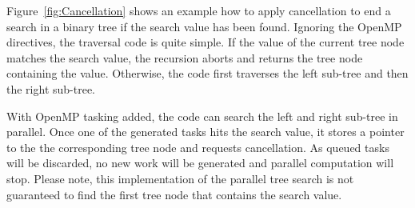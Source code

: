 Figure~\ref{fig:Cancellation} shows an example how to apply cancellation to end a search in a binary tree if the search value has been found.
Ignoring the OpenMP directives, the traversal code is quite simple.
If the value of the current tree node matches the search value, the recursion aborts and returns the tree node containing the value.
Otherwise, the code first traverses the left sub-tree and then the right sub-tree.

With OpenMP tasking added, the code can search the left and right sub-tree in parallel.
Once one of the generated tasks hits the search value, it stores a pointer to the the corresponding tree node and requests cancellation.
As queued tasks will be discarded, no new work will be generated and parallel computation will stop.
Please note, this implementation of the parallel tree search is not guaranteed to find the first tree node that contains the search value.

